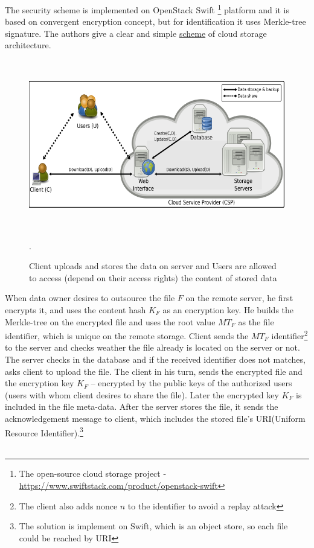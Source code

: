 \documentclass[12pt]{article}
\begin{document}
The security scheme is implemented on OpenStack Swift \footnote{The open-source cloud storage project - \url{https://www.swiftstack.com/product/openstack-swift}} platform and it is based on  convergent encryption concept\cite{CovergentEnc}, but for identification it uses Merkle-tree signature. The authors give a clear and simple \hyperref[fig:ConvMT]{scheme} of cloud storage architecture.
\begin{figure}[ht] 
\begin{center}
\includegraphics[height=210pt,width=400pt]{ConvMT}
\caption{Client uploads and stores the data on server and Users are allowed to access (depend on their access rights) the content of stored data}
\label{fig:ConvMT} .
\end{center}
\end{figure}
When data owner desires to outsource the file $F$ on the remote server, he first encrypts it, and uses the content hash $K_F$ as an encryption key. He builds the Merkle-tree on the encrypted file and  uses the root value $MT_F$ as the file identifier, which is unique on the remote storage. Client sends the $MT_F$ identifier\footnote{The client also adds nonce $n$ to the identifier to avoid a replay attack} to the server and checks weather the file already is located on the server or not. The server checks in the database and if the received identifier does not matches, asks client to upload the file. The client in his turn, sends the encrypted file and the encryption key $K_F$ -- encrypted by the public keys of the authorized users (users with whom client desires to share the file). Later the encrypted key $K_F$ is included in the file meta-data. After the server stores the file, it sends the acknowledgement message to client, which includes the stored file's URI(Uniform Resource Identifier).\footnote{The solution is implement on Swift, which is an object store, so each file could be reached by URI}\\\\
\end{document}
